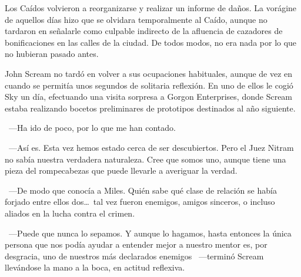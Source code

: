 Los Caídos volvieron a reorganizarse y realizar un informe de daños. La vorágine de aquellos días hizo que se olvidara temporalmente al Caído, aunque no tardaron en señalarle como culpable indirecto de la afluencia de cazadores de bonificaciones en las calles de la ciudad. De todos modos, no era nada por lo que no hubieran pasado antes.

John Scream no tardó en volver a sus ocupaciones habituales, aunque de vez en cuando se permitía unos segundos de solitaria reflexión. En uno de ellos le cogió Sky un día, efectuando una visita sorpresa a Gorgon Enterprises, donde Scream estaba realizando bocetos preliminares de prototipos destinados al año siguiente.

~---Ha ido de poco, por lo que me han contado.

~---Así es. Esta vez hemos estado cerca de ser descubiertos. Pero el Juez Nitram no sabía nuestra verdadera naturaleza. Cree que somos uno, aunque tiene una pieza del rompecabezas que puede llevarle a averiguar la verdad.

~---De modo que conocía a Miles. Quién sabe qué clase de relación se había forjado entre ellos dos\dots\ tal vez fueron enemigos, amigos sinceros, o incluso aliados en la lucha contra el crimen.

~---Puede que nunca lo sepamos. Y aunque lo hagamos, hasta entonces la única persona que nos podía ayudar a entender mejor a nuestro mentor es, por desgracia, uno de nuestros más declarados enemigos ~---terminó Scream llevándose la mano a la boca, en actitud reflexiva.
